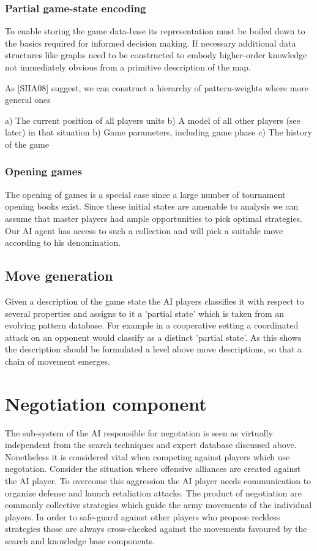\documentclass[12pt]{article}
\begin{document}
\subsubsection{Partial game-state encoding}

To enable storing the game data-base its representation must be boiled down to 
the basics required for informed decision making. If necessary additional data
structures like graphs need to be constructed to embody higher-order knowledge
not immediately obvious from a primitive description of the map. 

As [SHA08] suggest, we can construct a hierarchy of pattern-weights where more 
general ones 

a) The current position of all players units
b) A model of all other players (see later) in that situation 
b) Game parameters, including game phase
c) The history of the game


\subsubsection{Opening games}

The opening of games is a special case since a large number
of tournament opening books exist. Since these initial states are amenable to
analysis we can assume that master players had ample opportunities to
pick optimal strategies. Our AI agent has access to such a collection
and will pick a suitable move according to his denomination.

\subsection{Move generation}

Given a description of the game state the AI players classifies
it with respect to several properties and assigns to it a 'partial state'
which is taken from an evolving pattern database. For example in a cooperative
setting a coordinated attack on an opponent would classify as a distinct
'partial state'. As this shows the description should be formulated a level
above move descriptions, so that a chain of movement emerges.

\section{Negotiation component}

The sub-system of the AI responsible for negotation
is seen as virtually independent from the search techniques
and expert database discussed above. Nonetheless it is 
considered vital when competing against players which
use negotation. Consider the situation where offensive alliances
are created against the AI player. To overcome this aggression 
the AI player needs communication to organize defense and launch
retaliation attacks. The product of negotiation are commonly
collective strategies which guide the army movements of the
individual players. In order to safe-guard against other
players who propose reckless strategies those are always
cross-checked against the movements favoured by the search
and knowledge base components.
\end{document}
